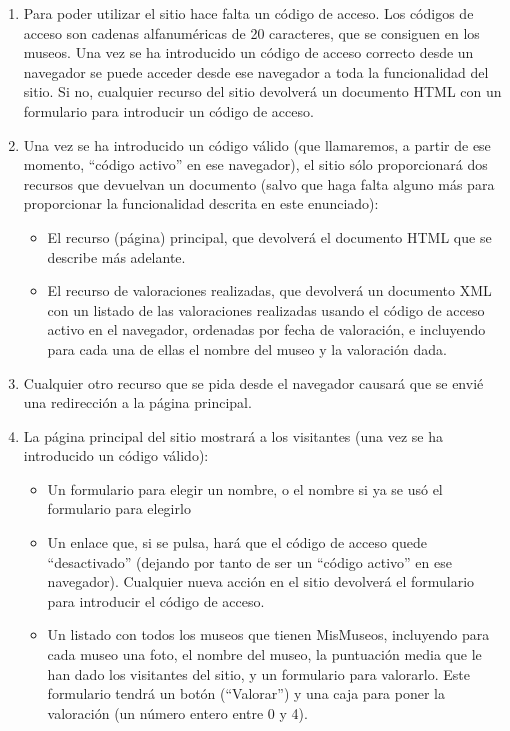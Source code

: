 \begin{enumerate}
\item Para poder utilizar el sitio hace falta un código de acceso. Los códigos de acceso son cadenas alfanuméricas de 20 caracteres, que se consiguen en los museos. Una vez se ha introducido un código de acceso correcto desde un navegador se puede acceder desde ese navegador a toda la funcionalidad del sitio. Si no, cualquier recurso del sitio devolverá un documento HTML con un formulario para introducir un código de acceso.

\item Una vez se ha introducido un código válido (que llamaremos, a partir de ese momento, ``código activo'' en ese navegador), el sitio sólo proporcionará dos recursos que devuelvan un documento (salvo que haga falta alguno más para proporcionar la funcionalidad descrita en este enunciado):
  \begin{itemize}
  \item El recurso (página) principal, que devolverá el documento HTML que se describe más adelante.
  \item El recurso de valoraciones realizadas, que devolverá un documento XML con un listado de las valoraciones realizadas usando el código de acceso activo en el navegador, ordenadas por fecha de valoración, e incluyendo para cada una de ellas el nombre del museo y la valoración dada.
  \end{itemize}

\item Cualquier otro recurso que se pida desde el navegador causará que se envié una redirección a la página principal.

\item La página principal del sitio mostrará a los visitantes (una vez se ha introducido un código válido):
  \begin{itemize}
  \item Un formulario para elegir un nombre, o el nombre si ya se usó el formulario para elegirlo
  \item Un enlace que, si se pulsa, hará que el código de acceso quede ``desactivado'' (dejando por tanto de ser un ``código activo'' en ese navegador). Cualquier nueva acción en el sitio devolverá el formulario para introducir el código de acceso.
  \item Un listado con todos los museos que tienen MisMuseos, incluyendo para cada museo una foto, el nombre del museo, la puntuación media que le han dado los visitantes del sitio, y un formulario para valorarlo. Este formulario tendrá un botón (``Valorar'') y una caja para poner la valoración (un número entero entre 0 y 4).
  \end{itemize}


\end{enumerate}
